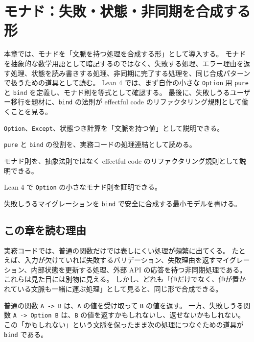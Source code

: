 \chapter{モナド：失敗・状態・非同期を合成する形}
\label{chap:monad}

\begin{chapterabstract}
本章では、モナドを「文脈を持つ処理を合成する形」として導入する。
モナドを抽象的な数学用語として暗記するのではなく、失敗する処理、エラー理由を返す処理、状態を読み書きする処理、非同期に完了する処理を、同じ合成パターンで扱うための道具として読む。
Lean 4 では、まず自作の小さな \texttt{Option} 用 \texttt{pure} と \texttt{bind} を定義し、モナド則を等式として確認する。
最後に、失敗しうるユーザー移行を題材に、\texttt{bind} の法則が effectful code のリファクタリング規則として働くことを見る。
\end{chapterabstract}

\begin{learninggoals}
\item \texttt{Option}、\texttt{Except}、状態つき計算を「文脈を持つ値」として説明できる。
\item \texttt{pure} と \texttt{bind} の役割を、実務コードの処理連結として読める。
\item モナド則を、抽象法則ではなく effectful code のリファクタリング規則として説明できる。
\item Lean 4 で \texttt{Option} の小さなモナド則を証明できる。
\item 失敗しうるマイグレーションを \texttt{bind} で安全に合成する最小モデルを書ける。
\end{learninggoals}

\section{この章を読む理由}

実務コードでは、普通の関数だけでは表しにくい処理が頻繁に出てくる。
たとえば、入力が欠けていれば失敗するバリデーション、失敗理由を返すマイグレーション、内部状態を更新する処理、外部 API の応答を待つ非同期処理である。
これらは見た目には別物に見える。
しかし、どれも「値だけでなく、値が置かれている文脈も一緒に運ぶ処理」として見ると、同じ形で合成できる。

\begin{intuitionbox}
普通の関数 \texttt{A -> B} は、\texttt{A} の値を受け取って \texttt{B} の値を返す。
一方、失敗しうる関数 \texttt{A -> Option B} は、\texttt{B} の値を返すかもしれないし、返せないかもしれない。
この「かもしれない」という文脈を保ったまま次の処理につなぐための道具が \texttt{bind} である。
\end{intuitionbox}

